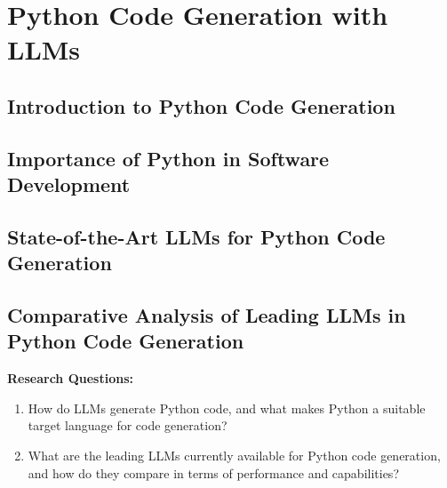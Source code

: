 
\chapter{Python Code Generation with LLMs}
\label{chap:python_code_generation}
\pagestyle{fancy}

\section{Introduction to Python Code Generation}

\section{Importance of Python in Software Development}

\section{State-of-the-Art LLMs for Python Code Generation}

\section{Comparative Analysis of Leading LLMs in Python Code Generation}

\textbf{Research Questions:}
\begin{enumerate}
    \item How do LLMs generate Python code, and what makes Python a suitable target language for code generation?
    \item What are the leading LLMs currently available for Python code generation, and how do they compare in terms of performance and capabilities?
\end{enumerate}

